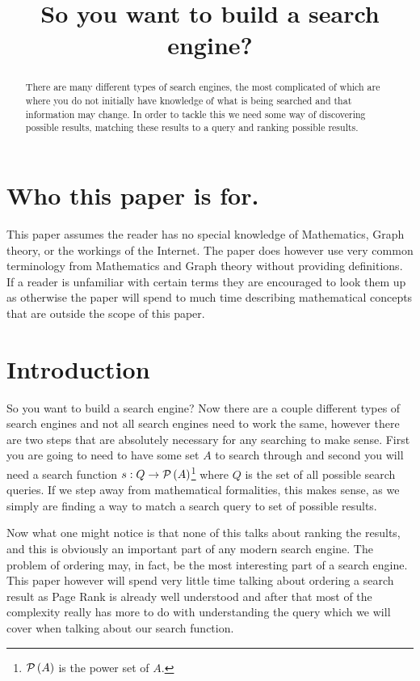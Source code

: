 \documentclass{article}
\title{So you want to build a search engine?}
\begin{document}
	\maketitle
	
	\tableofcontents
	
	\begin{abstract}
		There are many different types of search engines, the most complicated of which are where you do not initially have knowledge of what is being searched and that information may change. In order to tackle this we need some way of discovering possible results, matching these results to a query and ranking possible results. %
	\end{abstract}
	
	\section{Who this paper is for.}
	This paper assumes the reader has no special knowledge of Mathematics, Graph theory, or the workings of the Internet. The paper does however use very common terminology from Mathematics and Graph theory without providing definitions. If a reader is unfamiliar with certain terms they are encouraged to look them up as otherwise the paper will spend to much time describing mathematical concepts that are outside the scope of this paper.
	
	\section{Introduction}
	So you want to build a search engine? Now there are a couple different types of search engines and not all search engines need to work the same, however there are two steps that are absolutely necessary for any searching to make sense. First you are going to need to have some set $A$ to search through and second you will need a search function $s:Q\to\mathcal P\left( {A} \right)$\footnote{$\mathcal P\left( {A} \right)$ is the power set of $A$.} where $Q$ is the set of all possible search queries. If we step away from mathematical formalities, this makes sense, as we simply are finding a way to match a search query to set of possible results.
	
	Now what one might notice is that none of this talks about ranking the results, and this is obviously an important part of any modern search engine. The problem of ordering may, in fact, be the most interesting part of a search engine. This paper however will spend very little time talking about ordering a search result as Page Rank is already well understood and after that most of the complexity really has more to do with understanding the query which we will cover when talking about our search function.
	
\end{document}
